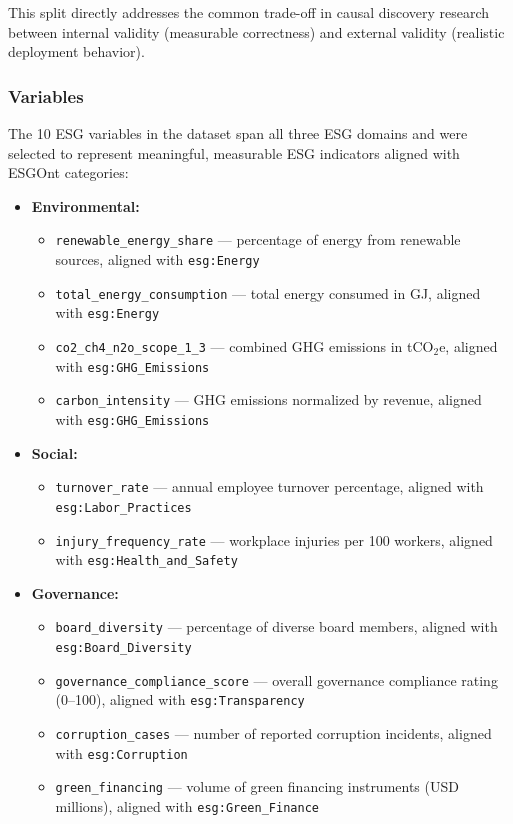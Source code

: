 \documentclass[a4paper,11pt,oneside]{article}
\begin{document}
This split directly addresses the common trade-off in causal discovery research between internal validity (measurable correctness) and external validity (realistic deployment behavior).

\subsubsection{Variables}

The 10 ESG variables in the dataset span all three ESG domains and were selected to represent meaningful, measurable ESG indicators aligned with ESGOnt categories:

\begin{itemize}
    \item \textbf{Environmental:}
    \begin{itemize}
        \item \texttt{renewable\_energy\_share} — percentage of energy from renewable sources, aligned with \texttt{esg:Energy}
        \item \texttt{total\_energy\_consumption} — total energy consumed in GJ, aligned with \texttt{esg:Energy}
        \item \texttt{co2\_ch4\_n2o\_scope\_1\_3} — combined GHG emissions in tCO$_2$e, aligned with \texttt{esg:GHG\_Emissions}
        \item \texttt{carbon\_intensity} — GHG emissions normalized by revenue, aligned with \texttt{esg:GHG\_Emissions}
    \end{itemize}
    \item \textbf{Social:}
    \begin{itemize}
        \item \texttt{turnover\_rate} — annual employee turnover percentage, aligned with \texttt{esg:Labor\_Practices}
        \item \texttt{injury\_frequency\_rate} — workplace injuries per 100 workers, aligned with \texttt{esg:Health\_and\_Safety}
    \end{itemize}
    \item \textbf{Governance:}
    \begin{itemize}
        \item \texttt{board\_diversity} — percentage of diverse board members, aligned with \texttt{esg:Board\_Diversity}
        \item \texttt{governance\_compliance\_score} — overall governance compliance rating (0–100), aligned with \texttt{esg:Transparency}
        \item \texttt{corruption\_cases} — number of reported corruption incidents, aligned with \texttt{esg:Corruption}
        \item \texttt{green\_financing} — volume of green financing instruments (USD millions), aligned with \texttt{esg:Green\_Finance}
    \end{itemize}
\end{itemize}
\end{document}
